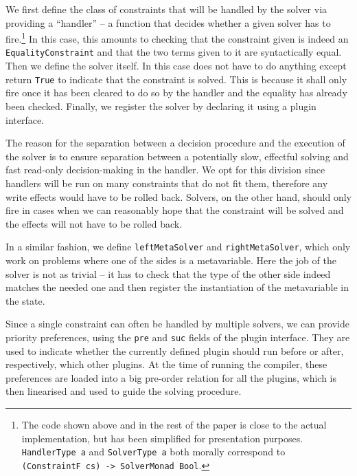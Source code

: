 We first define the class of constraints that will be handled by the
solver via providing a ``handler'' -- a function that decides whether a
given solver has to fire.\footnote{The code shown above and in the rest
  of the paper is close to the actual implementation, but has been
  simplified for presentation purposes. \texttt{HandlerType\ a} and
  \texttt{SolverType\ a} both morally correspond to
  \texttt{(ConstraintF\ cs)\ -\textgreater{}\ SolverMonad\ Bool}.} In
this case, this amounts to checking that the constraint given is indeed
an \texttt{EqualityConstraint} and that the two terms given to it are
syntactically equal. Then we define the solver itself. In this case does
not have to do anything except return \texttt{True} to indicate that the
constraint is solved. This is because it shall only fire once it has
been cleared to do so by the handler and the equality has already been
checked. Finally, we register the solver by declaring it using a plugin
interface.

The reason for the separation between a decision procedure and the
execution of the solver is to ensure separation between a potentially
slow, effectful solving and fast read-only decision-making in the
handler. We opt for this division since handlers will be run on many
constraints that do not fit them, therefore any write effects would have
to be rolled back. Solvers, on the other hand, should only fire in cases
when we can reasonably hope that the constraint will be solved and the
effects will not have to be rolled back.

In a similar fashion, we define \texttt{leftMetaSolver} and
\texttt{rightMetaSolver}, which only work on problems where one of the
sides is a metavariable. Here the job of the solver is not as trivial --
it has to check that the type of the other side indeed matches the
needed one and then register the instantiation of the metavariable in
the state.

Since a single constraint can often be handled by multiple solvers, we
can provide priority preferences, using the \texttt{pre} and
\texttt{suc} fields of the plugin interface. They are used to indicate
whether the currently defined plugin should run before or after,
respectively, which other plugins. At the time of running the compiler,
these preferences are loaded into a big pre-order relation for all the
plugins, which is then linearised and used to guide the solving
procedure.


